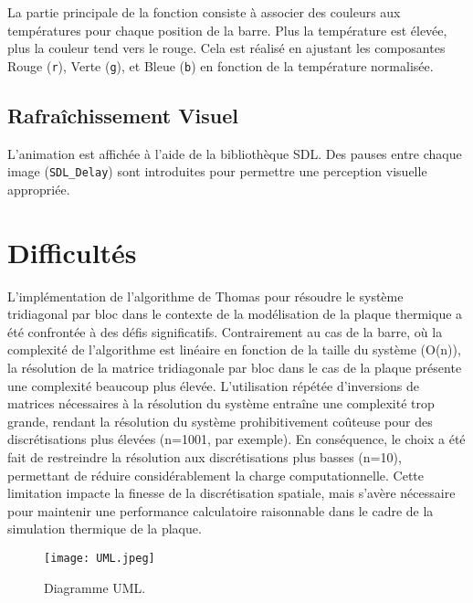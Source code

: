 \documentclass{article}
\begin{document}
La partie principale de la fonction consiste à associer des couleurs aux températures pour chaque position de la barre. Plus la température est élevée, plus la couleur tend vers le rouge. Cela est réalisé en ajustant les composantes Rouge (\texttt{r}), Verte (\texttt{g}), et Bleue (\texttt{b}) en fonction de la température normalisée.

\subsection{Rafraîchissement Visuel}

L'animation est affichée à l'aide de la bibliothèque SDL. Des pauses entre chaque image (\texttt{SDL\_Delay}) sont introduites pour permettre une perception visuelle appropriée.

\newpage

\section{Difficultés}

\par
L'implémentation de l'algorithme de Thomas pour résoudre le système tridiagonal par bloc dans le contexte de la modélisation de la plaque thermique a été confrontée à des défis significatifs. Contrairement au cas de la barre, où la complexité de l'algorithme est linéaire en fonction de la taille du système (O(n)), la résolution de la matrice tridiagonale par bloc dans le cas de la plaque présente une complexité beaucoup plus élevée. L'utilisation répétée d'inversions de matrices nécessaires à la résolution du système entraîne une complexité trop grande, rendant la résolution du système prohibitivement coûteuse pour des discrétisations plus élevées (n=1001, par exemple). En conséquence, le choix a été fait de restreindre la résolution aux discrétisations plus basses (n=10), permettant de réduire considérablement la charge computationnelle. Cette limitation impacte la finesse de la discrétisation spatiale, mais s'avère nécessaire pour maintenir une performance calculatoire raisonnable dans le cadre de la simulation thermique de la plaque.

\newpage


\begin{landscape}
  \begin{figure}[h]
    \centering
    \texttt{[image: UML.jpeg]}
    \caption{Diagramme UML.}
    \label{fig:uml}
  \end{figure}
\end{landscape}
\end{document}
